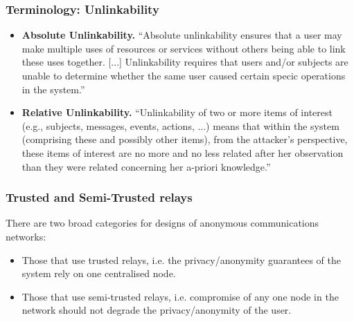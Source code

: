 \begin{frame}
  \frametitle{Terminology: Unlinkability}

  \begin{itemize}
    \item<2-> \textbf{Absolute Unlinkability.} ``Absolute unlinkability ensures that a user
      may make multiple uses of resources or services without others being able to
      link these uses together.  [...]  Unlinkability requires that users and/or
      subjects are unable to determine whether the same user caused certain specic
      operations in the system.''
    \item<3-> \textbf{Relative Unlinkability.} ``Unlinkability of two or more items of
      interest (e.g., subjects, messages, events, actions, ...)  means that within
      the system (comprising these and possibly other items), from the attacker's
      perspective, these items of interest are no more and no less related after
      her observation than they were related concerning her a-priori knowledge.''
  \end{itemize}
\end{frame}

\begin{frame}
  \frametitle{Trusted and Semi-Trusted relays}

  \begin{block}{There are two broad categories for designs of anonymous
      communications networks:}
    \begin{itemize}
    \item<2-> Those that use trusted relays, i.e. the privacy/anonymity guarantees
      of the system rely on one centralised node.
    \item<3-> Those that use semi-trusted relays, i.e. compromise of any one node
      in the network should not degrade the privacy/anonymity of the user.
    \end{itemize}
  \end{block}
\end{frame}


